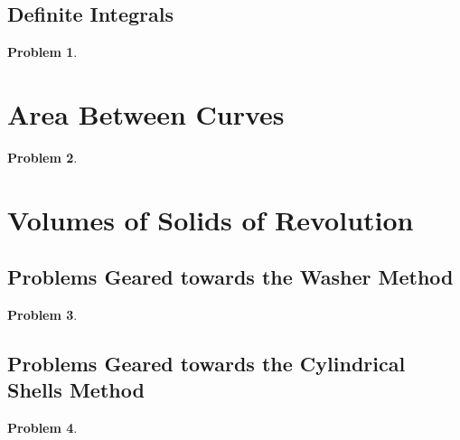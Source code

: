 \documentclass{article}
\newtheorem{problem}{Problem}
\begin{document}
\subsection{Definite Integrals}
\begin{problem}

\end{problem}
\section{Area Between Curves}
\begin{problem}

\end{problem}

\section{Volumes of Solids of Revolution}
\subsection{Problems Geared towards the Washer Method}
\begin{problem}

\end{problem}

\subsection{Problems Geared towards the Cylindrical Shells Method}
\begin{problem}

\end{problem}
\end{document}
